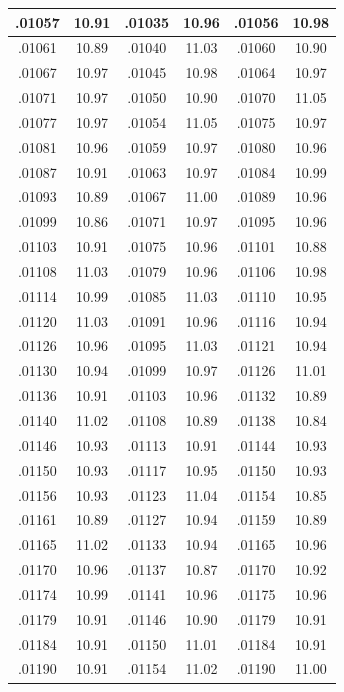\documentclass[10pt,twoside]{report}
\begin{document}
\begin{appendices}
\begin{longtable}{|c|c||c|c||c|c|}
.01057 & 10.91 & .01035 & 10.96 & .01056 & 10.98\\\hline
.01061 & 10.89 & .01040 & 11.03 & .01060 & 10.90\\\hline
.01067 & 10.97 & .01045 & 10.98 & .01064 & 10.97\\\hline
.01071 & 10.97 & .01050 & 10.90 & .01070 & 11.05\\\hline
.01077 & 10.97 & .01054 & 11.05 & .01075 & 10.97\\\hline
.01081 & 10.96 & .01059 & 10.97 & .01080 & 10.96\\\hline
.01087 & 10.91 & .01063 & 10.97 & .01084 & 10.99\\\hline
.01093 & 10.89 & .01067 & 11.00 & .01089 & 10.96\\\hline
.01099 & 10.86 & .01071 & 10.97 & .01095 & 10.96\\\hline
.01103 & 10.91 & .01075 & 10.96 & .01101 & 10.88\\\hline
.01108 & 11.03 & .01079 & 10.96 & .01106 & 10.98\\\hline
.01114 & 10.99 & .01085 & 11.03 & .01110 & 10.95\\\hline
.01120 & 11.03 & .01091 & 10.96 & .01116 & 10.94\\\hline
.01126 & 10.96 & .01095 & 11.03 & .01121 & 10.94\\\hline
.01130 & 10.94 & .01099 & 10.97 & .01126 & 11.01\\\hline
.01136 & 10.91 & .01103 & 10.96 & .01132 & 10.89\\\hline
.01140 & 11.02 & .01108 & 10.89 & .01138 & 10.84\\\hline
.01146 & 10.93 & .01113 & 10.91 & .01144 & 10.93\\\hline
.01150 & 10.93 & .01117 & 10.95 & .01150 & 10.93\\\hline
.01156 & 10.93 & .01123 & 11.04 & .01154 & 10.85\\\hline
.01161 & 10.89 & .01127 & 10.94 & .01159 & 10.89\\\hline
.01165 & 11.02 & .01133 & 10.94 & .01165 & 10.96\\\hline
.01170 & 10.96 & .01137 & 10.87 & .01170 & 10.92\\\hline
.01174 & 10.99 & .01141 & 10.96 & .01175 & 10.96\\\hline
.01179 & 10.91 & .01146 & 10.90 & .01179 & 10.91\\\hline
.01184 & 10.91 & .01150 & 11.01 & .01184 & 10.91\\\hline
.01190 & 10.91 & .01154 & 11.02 & .01190 & 11.00\\\hline

\end{longtable}
\end{appendices}
\end{document}
